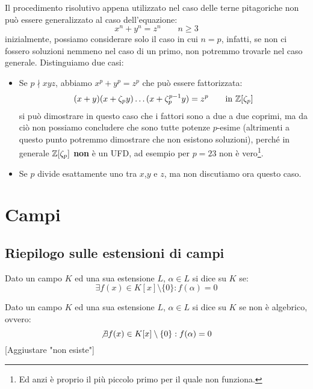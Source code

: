 \documentclass[11pt]{scrartcl}
\begin{document}
\newpage
\begin{remark}
    Il procedimento risolutivo appena utilizzato nel caso delle terne pitagoriche non può essere generalizzato al caso dell'equazione:
    \[ x^n + y^n = z^n \qquad n\geq 3
        \]
    inizialmente, possiamo considerare solo il caso in cui $n = p$, infatti, se non ci fossero soluzioni nemmeno nel caso di un primo, non potremmo
    trovarle nel caso generale. Distinguiamo due casi:
    \begin{itemize}
        \item Se $p \nmid xyz$, abbiamo $x^p+y^p = z^p$ che può essere fattorizzata:
            \[ (x+y)(x+\zeta_py) \ldots (x + \zeta_p^{p-1}y) = z^p \qquad \text{in $\mathbb Z[\zeta_p]$}
                \]
            si può dimostrare in questo caso che i fattori sono a due a due coprimi,
            ma da ciò non possiamo concludere che sono tutte potenze $p$-esime (altrimenti a questo punto potremmo dimostrare che non esistono soluzioni),
            perché in generale $\mathbb Z[\zeta_p]$ \textbf{non} è un UFD, ad esempio per $p = 23$ non è vero\footnote{Ed anzi è proprio il più piccolo primo per il quale non funziona.}.
        \item Se $p$ divide esattamente uno tra $x$,$y$ e $z$, ma non discutiamo ora questo caso.
    \end{itemize}
\end{remark}

\newpage
\section{Campi}
\subsection{Riepilogo sulle estensioni di campi}
\begin{definition}
    Dato un campo $K$ ed una sua estensione $L$, $\alpha \in L$ si dice  su $K$ se:
        \[ \exists f(x) \in K[x]\setminus\{0\} : f(\alpha) = 0
        \] 
\end{definition}

\begin{definition}
    Dato un campo $K$ ed una sua estensione $L$, $\alpha \in L$ si dice  su $K$ se non è algebrico, ovvero:
        \[ \not\exists f(x) \in K[x]\setminus\{0\} : f(\alpha) = 0
        \] 
	[Aggiustare "non esiste"]
\end{definition}
\end{document}
